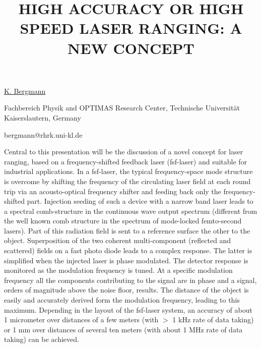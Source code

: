 \title{HIGH ACCURACY OR HIGH SPEED LASER RANGING: A NEW CONCEPT}

\underline{K. Bergmann} 

{\normalsize{\vspace{-4mm}
Fachbereich Physik and OPTIMAS Research Center,
Technische Universit\"{a}t Kaiserslautern, Germany

\email bergmann@rhrk.uni-kl.de}}

Central to this presentation will be the discussion of a novel concept for laser ranging, based
on a frequency-shifted feedback laser (fsf-laser) and suitable for industrial applications. In
a fsf-laser, the typical frequency-space mode structure is overcome by shifting the frequency
of the circulating laser field at each round trip via an acousto-optical frequency shifter and
feeding back only the frequency-shifted part. Injection seeding of such a device with a narrow
band laser leads to a spectral comb-structure in the continuous wave output spectrum (different
from the well known comb structure in the spectrum of mode-locked femto-second lasers). Part of
this radiation field is sent to a reference surface the other to the object. Superposition of
the two coherent multi-component (reflected and scattered) fields on a fast photo diode leads
to a complex response. The latter is simplified when the injected laser is phase modulated. The
detector response is monitored as the modulation frequency is tuned. At a specific modulation
frequency all the components contributing to the signal are in phase and a signal, orders of
magnitude above the noise floor, results. The distance of the object is easily and accurately
derived form the modulation frequency, leading to this maximum. Depending in the layout of the
fsf-laser system, an accuracy of about 1 micrometer over distances of a few meters (with $>$ 1 kHz
rate of data taking) or 1 mm over distances of several ten meters (with about 1 MHz rate of
data taking) can be achieved.

\vspace{\baselineskip}
